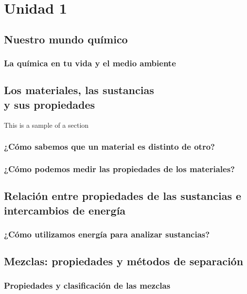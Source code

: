 \documentclass[11pt]{book}
\begin{document}

\restoregeometry
{}
\tableofcontents
\chapter{Unidad 1}
\newpage
\section{Nuestro mundo químico}
\subsection{La química en tu vida y el medio ambiente }

\newpage
\section{Los materiales, las sustancias\\ y sus propiedades}
This is a sample of a section
\subsection{¿Cómo sabemos que un material es distinto de otro?}
\subsection{¿Cómo podemos medir las propiedades de los materiales?}
\newpage
\section{Relación entre propiedades de las sustancias e intercambios de energía}
\subsection{¿Cómo utilizamos energía para analizar sustancias?}

\newpage
\section{Mezclas: propiedades y métodos de separación}

\subsection{Propiedades y clasificación de las mezclas}
\end{document}
